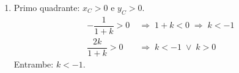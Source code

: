 \begin{question}[ID=6.5, subtitle={Fascio $x^2+y^2+2x+k(x^2+y^2-4y)=0$: luogo dei centri}, difficulty=difficile, tags={fasci, circonferenze}]
\begin{explanation}
\begin{enumerate}
    Ogni circonferenza del fascio passa per $O$, che è \textbf{interno} alla circonferenza unitaria, e per $\left(-\tfrac85,\tfrac45\right)$, che è \textbf{esterno} (dista $\tfrac{\sqrt{80}}{5}\approx1{,}79$ da $O$). Una curva chiusa che passa per un punto interno e uno esterno deve attraversarla: non può esserle tangente.
    \item Primo quadrante: $x_C>0$ e $y_C>0$.
    \[\begin{aligned}
    -\dfrac{1}{1+k}>0 &\;\Rightarrow\; 1+k<0 \;\Rightarrow\; k<-1\\
    \dfrac{2k}{1+k}>0 &\;\Rightarrow\; k<-1 \;\vee\; k>0
    \end{aligned}\]
    Entrambe: $k<-1$.
\end{enumerate}
\end{explanation}
\end{question}

